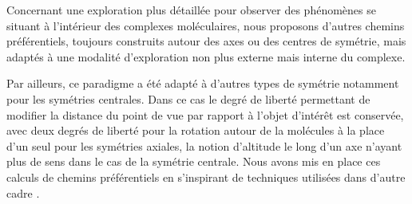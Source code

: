Concernant une exploration plus détaillée pour observer des phénomènes se situant à l'intérieur des complexes moléculaires, nous proposons d'autres chemins préférentiels, toujours construits autour des axes ou des centres de symétrie, mais adaptés à une modalité d'exploration non plus externe mais interne du complexe.  

Par ailleurs, ce paradigme a été adapté à d'autres types de symétrie notamment pour les symétries centrales. Dans ce cas le degré de liberté permettant de modifier la distance du point de vue par rapport à l'objet d'intérêt est conservée, avec deux degrés de liberté pour la rotation autour de la molécules à la place d'un seul pour les symétries axiales, la notion d'altitude le long d'un axe n'ayant plus de sens dans le cas de la symétrie centrale. Nous avons mis en place ces calculs de chemins préférentiels en s'inspirant de techniques utilisées dans d'autre cadre \cite{khan_hovercam:_2005,hanson_constrained_1997}.












